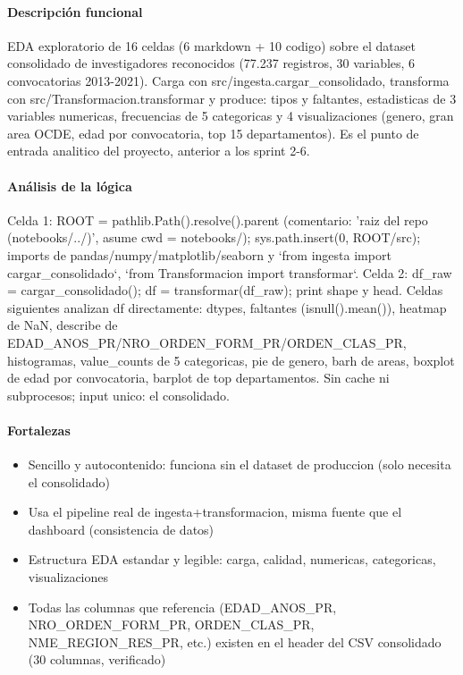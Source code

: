 \paragraph{Descripción funcional}
EDA exploratorio de 16 celdas (6 markdown + 10 codigo) sobre el dataset consolidado de investigadores reconocidos (77.237 registros, 30 variables, 6 convocatorias 2013-2021). Carga con src/ingesta.cargar\_consolidado, transforma con src/Transformacion.transformar y produce: tipos y faltantes, estadisticas de 3 variables numericas, frecuencias de 5 categoricas y 4 visualizaciones (genero, gran area OCDE, edad por convocatoria, top 15 departamentos). Es el punto de entrada analitico del proyecto, anterior a los sprint 2-6.

\paragraph{Análisis de la lógica}
Celda 1: ROOT = pathlib.Path().resolve().parent (comentario: 'raiz del repo (notebooks/../)', asume cwd = notebooks/); sys.path.insert(0, ROOT/src); imports de pandas/numpy/matplotlib/seaborn y `from ingesta import cargar\_consolidado`, `from Transformacion import transformar`. Celda 2: df\_raw = cargar\_consolidado(); df = transformar(df\_raw); print shape y head. Celdas siguientes analizan df directamente: dtypes, faltantes (isnull().mean()), heatmap de NaN, describe de EDAD\_ANOS\_PR/NRO\_ORDEN\_FORM\_PR/ORDEN\_CLAS\_PR, histogramas, value\_counts de 5 categoricas, pie de genero, barh de areas, boxplot de edad por convocatoria, barplot de top departamentos. Sin cache ni subprocesos; input unico: el consolidado.

\paragraph{Fortalezas}
\begin{itemize}
  \item Sencillo y autocontenido: funciona sin el dataset de produccion (solo necesita el consolidado)
  \item Usa el pipeline real de ingesta+transformacion, misma fuente que el dashboard (consistencia de datos)
  \item Estructura EDA estandar y legible: carga, calidad, numericas, categoricas, visualizaciones
  \item Todas las columnas que referencia (EDAD\_ANOS\_PR, NRO\_ORDEN\_FORM\_PR, ORDEN\_CLAS\_PR, NME\_REGION\_RES\_PR, etc.) existen en el header del CSV consolidado (30 columnas, verificado)
\end{itemize}

